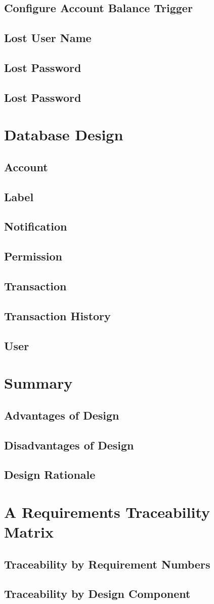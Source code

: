 \documentclass{article}
\begin{document}
\subsection{Configure Account Balance Trigger}
\subsection{Lost User Name}
\subsection{Lost Password}
\subsection{Lost Password}
\section{Database Design}
\subsection{Account}
\subsection{Label}
\subsection{Notification}
\subsection{Permission}
\subsection{Transaction}
\subsection{Transaction History   }
\subsection{User}
\section{Summary}
\subsection{Advantages of Design}
\subsection{Disadvantages of Design}
\subsection{Design Rationale}
\section{A Requirements Traceability Matrix}
\subsection{Traceability by Requirement Numbers}
\subsection{Traceability by Design Component}
\end{document}
